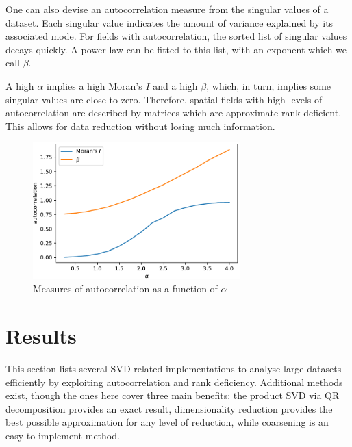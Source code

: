 \documentclass[ijgi,article,submit,moreauthors,pdftex,10pt,a4paper]{Definitions/mdpi}
\begin{document}
One can also devise an autocorrelation measure from the singular values of a dataset. Each singular value indicates the amount of variance explained by its associated mode. For fields with autocorrelation, the sorted list of singular values decays quickly. A power law can be fitted to this list, with an exponent which we call $\beta$.

A high $\alpha$ implies a high Moran's $I$ and a high $\beta$, which, in turn, implies some singular values are close to zero. Therefore, spatial fields with high levels of autocorrelation are described by matrices which are approximate rank deficient. This allows for data reduction without losing much information.

\begin{figure}[H]
\centering
\includegraphics[width=80mm]{Results/plotMoransIAndBeta.pdf}
\caption[Various measures of autocorrelation]{Measures of autocorrelation as a function of $\alpha$}
\label{fig:plotMoransIAndBeta}
\end{figure}

\section{Results} %

This section lists several SVD related implementations to analyse large datasets efficiently by exploiting autocorrelation and rank deficiency. Additional methods exist, though the ones here cover three main benefits: the product SVD via QR decomposition provides an exact result, dimensionality reduction provides the best possible approximation for any level of reduction, while coarsening is an easy-to-implement method.

\end{document}
